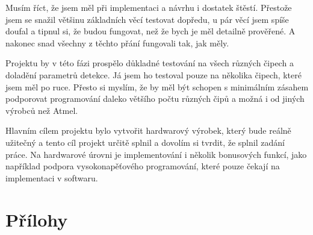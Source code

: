 \documentclass[11pt,a4paper,twoside,openright]{report}
\let\openright=\cleardoublepage
\begin{document}
Musím říct, že jsem měl při implementaci a návrhu i dostatek štěstí. Přestože jsem se snažil většinu základních věcí testovat dopředu, u pár věcí jsem spíše doufal a tipnul si, že budou fungovat, než že bych je měl detailně prověřené. A nakonec snad všechny z těchto přání fungovali tak, jak měly.

Projektu by v této fázi prospělo důkladné testování na všech různých čipech a doladění parametrů detekce. Já jsem ho testoval pouze na několika čipech, které jsem měl po ruce. Přesto si myslím, že by měl být schopen s minimálním zásahem podporovat programování daleko většího počtu různých čipů a možná i od jiných výrobců než Atmel.

Hlavním cílem projektu bylo vytvořit hardwarový výrobek, který bude reálně užitečný a tento cíl projekt určitě splnil a dovolím si tvrdit, že splnil zadání práce. Na hardwarové úrovni je implementování i několik bonusových funkcí, jako například podpora vysokonapěťového programování, které pouze čekají na implementaci v softwaru.

\printbibliography[title={Seznam použité literatury},heading={bibintoc}]

\openright
\listoffigures
{}


\part*{Přílohy}
\appendix

\renewcommand{\thefigure}{A.\arabic{figure}}

\setcounter{figure}{0}
\end{document}
